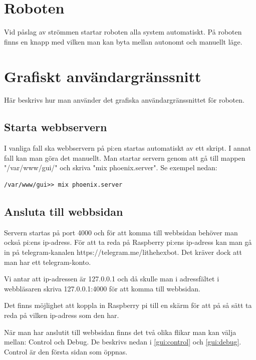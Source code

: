 \documentclass[a4paper,titlepage,12pt]{article}
\begin{document}
	\section{Roboten}
    Vid påslag av strömmen startar roboten alla system automatiskt.
    På roboten finns en knapp med vilken man kan byta mellan autonomt och
    manuellt läge.

	

	\section{Grafiskt användargränssnitt}
	Här beskrivs hur man använder det grafiska användargränssnittet för roboten.
	
	\subsection{Starta webbservern}
    I vanliga fall ska webbservern på pi:en startas automatiskt av ett skript.
    I annat fall kan man göra det manuellt.
	Man startar servern genom att gå till mappen "/var/www/gui/" och skriva "mix
    phoenix.server". Se exempel nedan:
	
	\begin{lstlisting}[style=linux]
	/var/www/gui>> mix phoenix.server
	\end{lstlisting}
	
	\subsection{Ansluta till webbsidan}
	Servern startas på port 4000 och för att komma till webbsidan behöver man
    också pi:ens ip-adress. För att ta reda på Raspberry pi:ens ip-adress kan man gå in
    på telegram-kanalen https://telegram.me/lithehexbot. Det kräver dock att
    man har ett telegram-konto.
	
	Vi antar att ip-adressen är 127.0.0.1 och då skulle man i adressfältet i
    webbläsaren skriva 127.0.0.1:4000 för att komma till webbsidan.
    
    Det finns möjlighet att koppla in Raspberry pi till en skärm för att på så sätt ta reda på 
    vilken ip-adress som den har. 
	
	När man har anslutit till webbsidan finns det två olika flikar man kan välja
    mellan: Control och Debug. De beskrivs nedan i \ref{gui:control} och
    \ref{gui:debug}. Control är den första sidan som öppnas.
    \newpage
	
\end{document}
